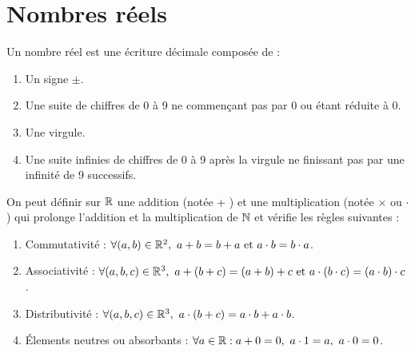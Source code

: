 \chapter{Nombres réels}\label{chap:nb_reels}

\begin{definition}
    Un nombre réel est une écriture décimale composée de :
    \begin{enumerate}
        \item Un signe $\pm$.
        \item Une suite de chiffres de 0 à 9 ne commençant pas par 0 ou étant réduite à 0.
        \item Une virgule.
        \item Une suite infinies de chiffres de 0 à 9 après la virgule ne finissant pas par une infinité de 9 successifs.
    \end{enumerate}
\end{definition}

\begin{proposition}
    On peut définir sur $\mathbb{R}$ une addition (notée \og + \fg) et une multiplication (notée \og $\times$ \fg ou \og $\cdot$ \fg) qui prolonge l'addition et la multiplication de $\mathbb{N}$ et vérifie les règles suivantes :
    \begin{enumerate}
        \item Commutativité : $\forall (a, b) \in \mathbb{R}^2,\ a + b = b + a \text{ et } a \cdot b = b \cdot a$.
        \item Associativité : $\forall (a, b, c) \in \mathbb{R}^3,\ a + (b + c) = (a + b) + c \text{ et } a \cdot (b \cdot c) = (a \cdot b) \cdot c$.
        \item Distributivité : $\forall (a, b, c) \in \mathbb{R}^3,\ a \cdot (b + c) = a \cdot b + a \cdot b$.
        \item \'Elements neutres ou absorbants : $\forall a \in \mathbb{R} : a + 0 = 0,\ a \cdot 1 = a,\ a \cdot 0 = 0$.
    \end{enumerate}
\end{proposition}

